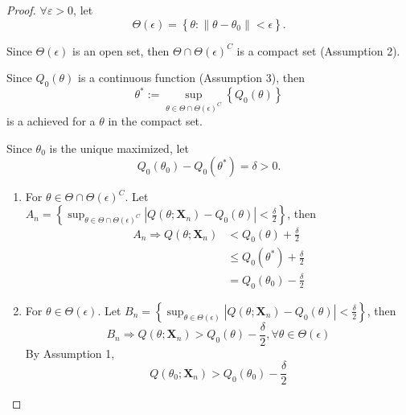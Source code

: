 \begin{proof}
    $\forall\varepsilon>0$, let
    \begin{equation*}
        \Theta(\epsilon)=\left\{\theta:\left\|\theta-\theta_{0}\right\|<\epsilon\right\}.
    \end{equation*}

    Since $\Theta(\epsilon)$ is an open set, then $\Theta\cap\Theta(\epsilon)^{C}$ is a compact set (Assumption 2).
    
    Since $Q_{0}(\theta)$ is a continuous function (Assumption 3), then
    \begin{equation*}
        \theta^{*}:=\sup_{\theta\in\Theta\cap \Theta(\epsilon)^{C}}\left\{Q_{0}(\theta)\right\}
    \end{equation*}
    is a achieved for a $\theta$ in the compact set. 
    
    Since $\theta_{0}$ is the unique maximized, let
    \begin{equation*}
        Q_{0}\left(\theta_{0}\right)-Q_{0}\left(\theta^{*}\right)=\delta>0.
    \end{equation*}

    \begin{enumerate}
        \item For $\theta\in\Theta\cap\Theta(\epsilon)^{C}$. Let $A_n=\left\{\sup_{\theta\in\Theta\cap\Theta(\epsilon)^{C}}\left|Q\left(\theta;\textbf{X}_{n}\right)-Q_{0}(\theta)\right|<\frac{\delta}{2}\right\}$, then
        \begin{equation*}
            \begin{aligned}
                A_{n}\Rightarrow Q\left(\theta;\textbf{X}_{n}\right)&<Q_{0}(\theta)+\frac{\delta}{2} \\
                &\leq Q_{0}\left(\theta^{*}\right)+\frac{\delta}{2} \\
                &= Q_{0}\left(\theta_{0}\right)-\frac{\delta}{2}
            \end{aligned}
        \end{equation*}
        \item For $\theta\in\Theta(\epsilon)$. Let $B_n=\left\{\sup_{\theta\in\Theta(\epsilon)}\left|Q\left(\theta;\boldsymbol{X}_{n}\right)-Q_{0}(\theta)\right|<\frac{\delta}{2}\right\}$, then
        \begin{equation*}
            B_{n}\Rightarrow Q\left(\theta;\boldsymbol{X}_{n}\right)>Q_{0}(\theta)-\frac{\delta}{2},\forall\theta\in\Theta(\epsilon)
        \end{equation*}
        By Assumption 1,
        \begin{equation*}
            Q\left(\theta_{0};\boldsymbol{X}_{n}\right)>Q_{0}\left(\theta_{0}\right)-\frac{\delta}{2}
        \end{equation*}
    \end{enumerate}


\end{proof}
